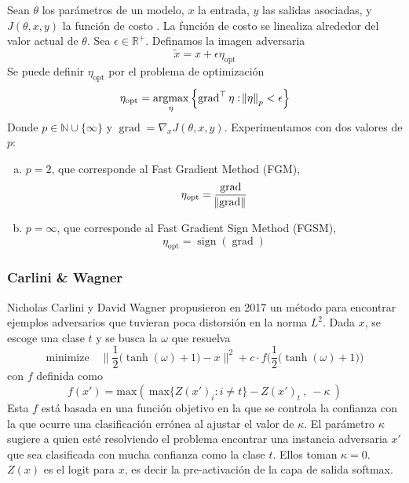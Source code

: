 Sean $\theta$ los parámetros de un modelo, $x$ la entrada, $y$ las salidas asociadas, y $J(\theta, x, y)$ la función de costo \cite{goodfellow2015explaining}. La función de costo se linealiza alrededor del valor actual de $\theta$. Sea $\epsilon \in \mathbb{R}^+$. Definamos la imagen adversaria 
\[\tilde{x} = x + \epsilon \eta_{\text{opt}}\]
Se puede definir $\eta_{\text{opt}}$ por el problema de optimización
\[\eta_{\text{opt}} = \operatornamewithlimits{argmax}_{\eta}\left\{ \operatorname{grad} ^\top \eta: \norm{\eta}_p< \epsilon\right\}\]
Donde $p \in \mathbb{N} \cup \{\infty\}$ y $\operatorname{grad} = \nabla_x J(\theta, x, y)$. Experimentamos con dos valores de $p$:
\begin{enumerate}[a)]
    \item $p = 2$, que corresponde al Fast Gradient Method (FGM),
    \[\eta_{\text{opt}} = \frac{\operatorname{grad}}{\norm{\operatorname{grad}}}\]
    \item $p = \infty$, que corresponde al Fast Gradient Sign Method (FGSM),
    \[\eta_{\text{opt}} = \operatorname{sign}(\operatorname{grad})\]
\end{enumerate}


\subsubsection{Carlini \& Wagner}
Nicholas Carlini y David Wagner \cite{carlini2017evaluating} propusieron en 2017 un método para encontrar ejemplos adversarios que tuvieran poca distorsión en la norma $L^2$. Dada $x$, se escoge una clase $t$ y se busca la $\omega$ que resuelva
\begin{equation*}
    \text{minimize} \quad \Big\lVert \dfrac{1}{2}\big(\tanh(\omega) + 1\big) - x \Big\rVert^2 + c\cdot f\bigg(\dfrac{1}{2}\big(\tanh(\omega) + 1\big)\bigg)
\end{equation*}
con $f$ definida como
\begin{equation*}
    f(x') = \text{max}(\ \text{max}\{Z(x')_i : i\neq t\} - Z(x')_t\ ,\ -\kappa\ )
\end{equation*}
Esta $f$ está basada en una función objetivo en la que se controla la confianza con la que ocurre una clasificación errónea al ajustar el valor de $\kappa$. El parámetro $\kappa$ sugiere a quien esté resolviendo el problema encontrar una instancia adversaria $x'$ que sea clasificada con mucha confianza como la clase $t$. Ellos toman $\kappa = 0$. $Z(x)$ es el logit para $x$, es decir la pre-activación de la capa de salida softmax.

